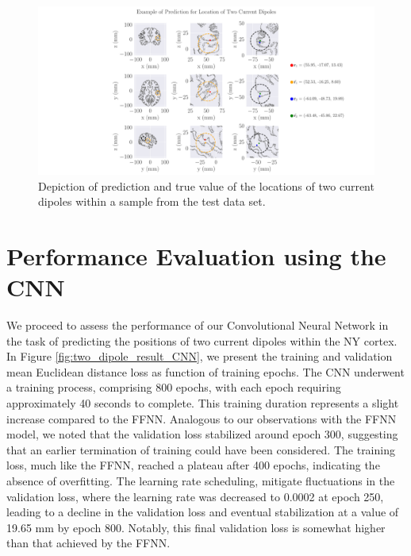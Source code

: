 \documentclass[a4paper, UKenglish, 11pt]{uiomaster}
\begin{document}
\begin{figure}[!htb]
  \hspace*{-4.5cm}
    \centering
    \includegraphics[width=20cm]{figures/NN_two_dipole/two_dipoles_prediction.pdf}
    \caption{Depiction of prediction and true value of the locations of two current dipoles within a sample from the test data set.}
    \label{fig:two_dipole_result}
\end{figure}

\FloatBarrier


\section{Performance Evaluation using the CNN}
\rednote{}
We proceed to assess the performance of our Convolutional Neural Network in the task of predicting the positions of two current dipoles within the NY cortex. In Figure \ref{fig:two_dipole_result_CNN}, we present the training and validation mean Euclidean distance loss as function of training epochs. The CNN underwent a training process, comprising 800 epochs, with each epoch requiring approximately 40 seconds to complete. This training duration represents a slight increase compared to the FFNN. Analogous to our observations with the FFNN model, we noted that the validation loss stabilized around epoch 300, suggesting that an earlier termination of training could have been considered. The training loss, much like the FFNN, reached a plateau after 400 epochs, indicating the absence of overfitting. The learning rate scheduling, mitigate fluctuations in the validation loss, where the learning rate was decreased to 0.0002 at epoch 250, leading to a decline in the validation loss and eventual stabilization at a value of 19.65 mm by epoch 800. Notably, this final validation loss is somewhat higher than that achieved by the FFNN.
\end{document}
